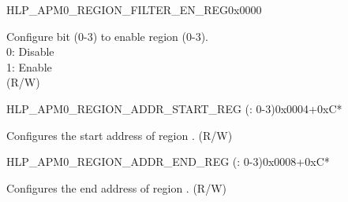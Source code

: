 \begin{register}{H}{LP\_APM0\_REGION\_FILTER\_EN\_REG}{0x0000}\label{regdesc:LPAPM0REGIONFILTERENREG}
%
%
\regnewline%
\begin{regdesc}\begin{reglist}
\label{fielddesc:LPAPM0REGIONFILTEREN}\item [LP\_APM0\_REGION\_FILTER\_EN] Configure bit  (0-3) to enable region  (0-3).\\ 
0: Disable \\ 
1: Enable  \\ (R/W)
\end{reglist}\end{regdesc}
\end{register}


\begin{register}{H}{LP\_APM0\_REGION\_ADDR\_START\_REG (: 0-3)}{0x0004+0xC*}\label{regdesc:LPAPM0REGIONNADDRSTARTREG}
%
\regnewline%
\begin{regdesc}\begin{reglist}
\label{fielddesc:LPAPM0REGIONNADDRSTART}\item [LP\_APM0\_REGION\regindex{n}\_ADDR\_START] Configures the start address of region . (R/W)
\end{reglist}\end{regdesc}
\end{register}


\begin{register}{H}{LP\_APM0\_REGION\_ADDR\_END\_REG (: 0-3)}{0x0008+0xC*}\label{regdesc:LPAPM0REGIONNADDRENDREG}
%
\regnewline%
\begin{regdesc}\begin{reglist}
\label{fielddesc:LPAPM0REGIONNADDREND}\item [LP\_APM0\_REGION\regindex{n}\_ADDR\_END] Configures the end address of region . (R/W)
\end{reglist}\end{regdesc}
\end{register}


